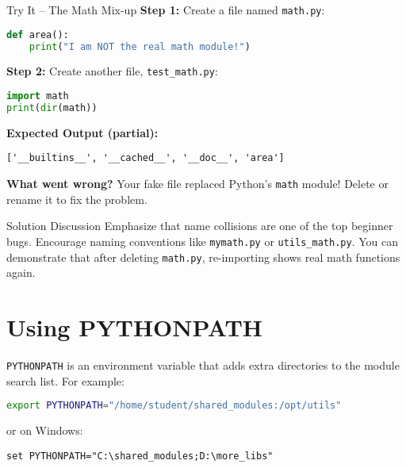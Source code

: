 \documentclass[12pt]{article}
\begin{document}
\begin{activitybox}{Try It – The Math Mix-up}
\textbf{Step 1:} Create a file named \texttt{math.py}:
\begin{lstlisting}[language=Python]
def area():
    print("I am NOT the real math module!")
\end{lstlisting}

\textbf{Step 2:} Create another file, \texttt{test\_math.py}:
\begin{lstlisting}[language=Python]
import math
print(dir(math))
\end{lstlisting}

\textbf{Expected Output (partial):}
\begin{lstlisting}
['__builtins__', '__cached__', '__doc__', 'area']
\end{lstlisting}

\textbf{What went wrong?}  
Your fake file replaced Python’s \texttt{math} module!  
Delete or rename it to fix the problem.
\end{activitybox}

\begin{teacherbox}{Solution Discussion}
Emphasize that name collisions are one of the top beginner bugs.  
Encourage naming conventions like \texttt{mymath.py} or \texttt{utils\_math.py}.  
You can demonstrate that after deleting \texttt{math.py}, re-importing shows real math functions again.
\end{teacherbox}

\section{Using PYTHONPATH}

\texttt{PYTHONPATH} is an environment variable that adds extra directories to the module search list.  
For example:

\begin{lstlisting}[language=bash]
export PYTHONPATH="/home/student/shared_modules:/opt/utils"
\end{lstlisting}

or on Windows:

\begin{lstlisting}
set PYTHONPATH="C:\shared_modules;D:\more_libs"
\end{lstlisting}
\end{document}
